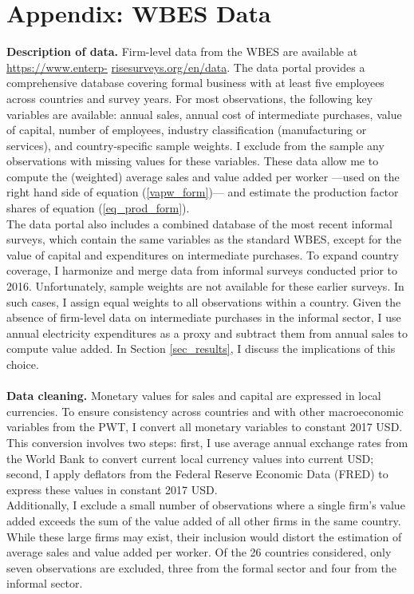 \documentclass[letterpaper, 12pt]{article}
\begin{document}
\section*{Appendix: WBES Data}\label{app_wbes}
\textbf{Description of data.} Firm-level data from the WBES are available at
\href{https://www.enterprisesurveys.org/en/data}{https://www.enterp-}
\href{https://www.enterprisesurveys.org/en/data}{risesurveys.org/en/data}. The data portal provides a comprehensive database covering formal business with at least five employees across countries and survey years. For most observations, the following key variables are available: annual sales, annual cost of intermediate purchases, value of capital, number of employees, industry classification (manufacturing or services), and country-specific sample weights. I exclude from the sample any observations with missing values for these variables. These data allow me to compute the (weighted) average sales and value added per worker —used on the right hand side of equation (\ref{vapw_form})— and estimate the production factor shares of equation (\ref{eq_prod_form}). 
\\The data portal also includes a combined database of the most recent informal surveys, which contain the same variables as the standard WBES, except for the value of capital and expenditures on intermediate purchases. To expand country coverage, I harmonize and merge data from informal surveys conducted prior to 2016. Unfortunately, sample weights are not available for these earlier surveys. In such cases, I assign equal weights to all observations within a country.
Given the absence of firm-level data on intermediate purchases in the informal sector, I use annual electricity expenditures as a proxy and subtract them from annual sales to compute value added. In Section \ref{sec_results}, I discuss the implications of this choice. 
\\
\\\textbf{Data cleaning.} Monetary values for sales and capital are expressed in local currencies. To ensure consistency across countries and with other macroeconomic variables from the PWT, I convert all monetary variables to constant 2017 USD. This conversion involves two steps: first, I use average annual exchange rates from the World Bank to convert current local currency values into current USD; second, I apply deflators from the Federal Reserve Economic Data (FRED) to express these values in constant 2017 USD.
\\Additionally, I exclude a small number of observations where a single firm's value added exceeds the sum of the value added of all other firms in the same country. While these large firms may exist, their inclusion would distort the estimation of average sales and value added per worker. Of the 26 countries considered, only seven observations are excluded, three from the formal sector and four from the informal sector.
\end{document}
